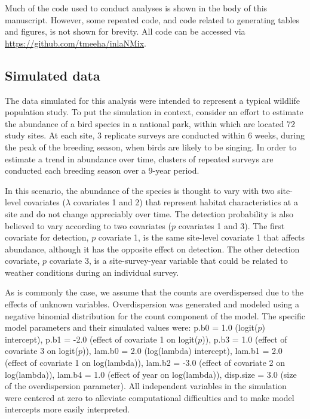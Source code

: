 \documentclass[article]{jss}
\begin{document}
Much of the code used to conduct analyses is shown in the body of this manuscript. However, some repeated code, and code related to generating tables and figures, is not shown for brevity. All code can be accessed via \url{https://github.com/tmeeha/inlaNMix}.

\subsection[Simulated data]{Simulated data}
The data simulated for this analysis were intended to represent a typical wildlife population study. To put the simulation in context, consider an effort to estimate the abundance of a bird species in a national park, within which are located 72 study sites. At each site, 3 replicate surveys are conducted within 6 weeks, during the peak of the breeding season, when birds are likely to be singing. In order to estimate a trend in abundance over time, clusters of repeated surveys are conducted each breeding season over a 9-year period.

In this scenario, the abundance of the species is thought to vary with two site-level covariates ($\lambda$ covariates 1 and 2) that represent habitat characteristics at a site and do not change appreciably over time. The detection probability is also believed to vary according to two covariates ($p$ covariates 1 and 3). The first covariate for detection, $p$ covariate 1, is the same site-level covariate 1 that affects abundance, although it has the opposite effect on detection. The other detection covariate, $p$ covariate 3, is a site-survey-year variable that could be related to weather conditions during an individual survey.

As is commonly the case, we assume that the counts are overdispersed due to the effects of unknown variables. Overdispersion was generated and modeled using a negative binomial distribution for the count component of the model. The specific model parameters and their simulated values were: p.b0 = 1.0 (logit($p$) intercept), p.b1 = -2.0 (effect of covariate 1 on logit($p$)), p.b3 = 1.0 (effect of covariate 3 on logit($p$)), lam.b0 = 2.0 (log(lambda) intercept), lam.b1 = 2.0 (effect of covariate 1 on log(lambda)), lam.b2 = -3.0 (effect of covariate 2 on log(lambda)), lam.b4 = 1.0 (effect of year on log(lambda)), disp.size = 3.0 (size of the overdispersion parameter). All independent variables in the simulation were centered at zero to alleviate computational difficulties and to make model intercepts more easily interpreted.
\end{document}
